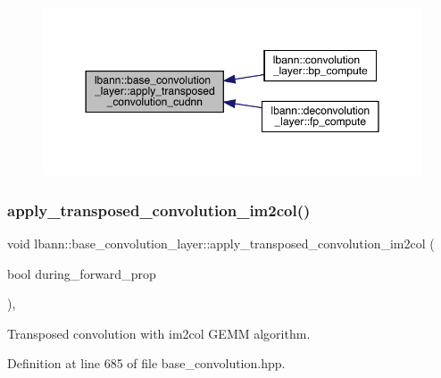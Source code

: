 \begin{figure}[H]
\begin{center}
\leavevmode
\includegraphics[width=350pt]{classlbann_1_1base__convolution__layer_a130907ca7a8e3b6676bdd4186c788ef4_icgraph}
\end{center}
\end{figure}
\mbox{\label{classlbann_1_1base__convolution__layer_a87fb2bf066a98052938e48a82dcd4fd2}} 
\subsubsection{\texorpdfstring{apply\+\_\+transposed\+\_\+convolution\+\_\+im2col()}{apply\_transposed\_convolution\_im2col()}}
{\footnotesize\ttfamily void lbann\+::base\+\_\+convolution\+\_\+layer\+::apply\+\_\+transposed\+\_\+convolution\+\_\+im2col (\begin{DoxyParamCaption}\item[{bool}]{during\+\_\+forward\+\_\+prop }\end{DoxyParamCaption})\hspace{0.3cm}{\ttfamily [inline]}, {\ttfamily [protected]}}

Transposed convolution with im2col G\+E\+MM algorithm. 

Definition at line 685 of file base\+\_\+convolution.\+hpp.


